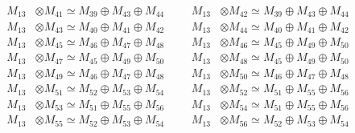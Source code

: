 \begin{align*}
M_{13} &\otimes M_{41} \simeq M_{39} \oplus M_{43} \oplus M_{44} &&& M_{13} &\otimes M_{42} \simeq M_{39} \oplus M_{43} \oplus M_{44}\\
M_{13} &\otimes M_{43} \simeq M_{40} \oplus M_{41} \oplus M_{42} &&& M_{13} &\otimes M_{44} \simeq M_{40} \oplus M_{41} \oplus M_{42}\\
M_{13} &\otimes M_{45} \simeq M_{46} \oplus M_{47} \oplus M_{48} &&& M_{13} &\otimes M_{46} \simeq M_{45} \oplus M_{49} \oplus M_{50}\\
M_{13} &\otimes M_{47} \simeq M_{45} \oplus M_{49} \oplus M_{50} &&& M_{13} &\otimes M_{48} \simeq M_{45} \oplus M_{49} \oplus M_{50}\\
M_{13} &\otimes M_{49} \simeq M_{46} \oplus M_{47} \oplus M_{48} &&& M_{13} &\otimes M_{50} \simeq M_{46} \oplus M_{47} \oplus M_{48}\\
M_{13} &\otimes M_{51} \simeq M_{52} \oplus M_{53} \oplus M_{54} &&& M_{13} &\otimes M_{52} \simeq M_{51} \oplus M_{55} \oplus M_{56}\\
M_{13} &\otimes M_{53} \simeq M_{51} \oplus M_{55} \oplus M_{56} &&& M_{13} &\otimes M_{54} \simeq M_{51} \oplus M_{55} \oplus M_{56}\\
M_{13} &\otimes M_{55} \simeq M_{52} \oplus M_{53} \oplus M_{54} &&& M_{13} &\otimes M_{56} \simeq M_{52} \oplus M_{53} \oplus M_{54}\\
\end{align*}

